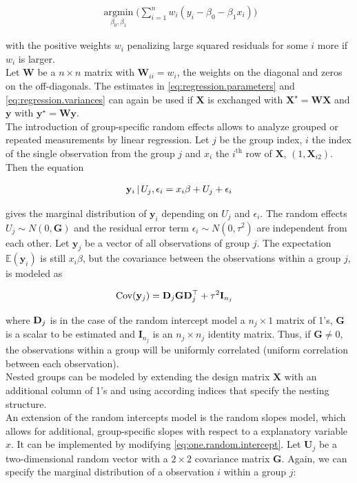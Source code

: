 \documentclass[11pt,a4paper,twoside]{book}\usepackage[]{graphicx}\usepackage[]{color}
\begin{document}
\begin{align}
\operatorname*{argmin}_{\beta_0, \beta_1}\Big(\sum_{i = 1}^n w_i(y_i - \beta_0 - \beta_1 x_i)\Big) \nonumber
\end{align}

with the positive weights $w_i$ penalizing large squared residuals for some $i$ more if $w_i$ is larger. \\
Let $\mathbf{W}$ be a $n \times n$ matrix with $\mathbf{W}_{ii} = w_i$, the weights on the diagonal and zeros on the off-diagonals. The estimates in \eqref{eq:regression.parameters} and \eqref{eq:regression.variances} can again be used if $\mathbf{X}$ is exchanged with $\mathbf{X}^\star =  \mathbf{W} \mathbf{X}$ and $\mathbf{y}$ with $\mathbf{y}^\star = \mathbf{W} \mathbf{y}$. \label{weighted.regression} \\
The introduction of group-specific random effects allows to analyze grouped or repeated measurements by linear regression. Let $j$ be the group index, $i$ the index of the single observation from the group $j$ and $x_i$ the $i^\textrm{th}$ row of $\mathbf{X}$, $(1, \mathbf{X}_{i2})$. Then the equation

\begin{align}
\mathbf{y}_i \,\vert\, U_j,\epsilon_{i} =  x_i\beta + U_j + \epsilon_{i} \label{eq:one.random.intercept}
\end{align}

gives the marginal distribution of $\mathbf{y}_i$ depending on $U{_j}$ and $\epsilon_i$. The random effects $U_j \sim N(0, \mathbf{G})$ and the residual error term $\epsilon_i \sim N(0, \tau^{2})$ are independent from each other. Let $\mathbf{y}_j$ be a vector of all observations of group $j$. The expectation $\mathbb{E}(\mathbf{y}_i)$ is still $x_i \beta$, but the covariance between the observations within a group $j$, is modeled as

\begin{align}
\operatorname{Cov}(\mathbf{y}_j) &= \mathbf{D}_j \mathbf{G} \mathbf{D}_j^\top + \tau^2 \mathbf{I}_{n_j} \label{eq:random.intercepts.covariance}
\end{align}

where ${\mathbf{D}}_j$ is in the case of the random intercept model a $n_j \times 1$ matrix of 1's, $\mathbf{G}$ is a scalar to be estimated and $\mathbf{I}_{n_j}$ is an $n_j \times n_j$ identity matrix. Thus, if $\mathbf{G} \neq 0$, the observations within a group will be uniformly correlated (uniform correlation between each observation). \\
Nested groups can be modeled by extending the design matrix $\mathbf{X}$ with an additional column of 1's and using according indices that specify the nesting structure.\\
An extension of the random intercepts model is the random slopes model, which allows for additional, group-specific slopes with respect to a explanatory variable $x$. It can be implemented by modifying \eqref{eq:one.random.intercept}. Let $\mathbf{U}_j$ be a two-dimensional random vector with a $2 \times 2$ covariance matrix $\mathbf{G}$. Again, we can specify the marginal distribution of a observation $i$ within a group $j$:
\end{document}
